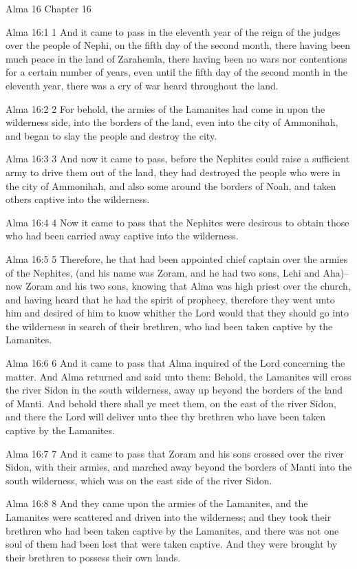 Alma 16
Chapter 16

Alma 16:1
 1 And it came to pass in the eleventh year of the reign of the
judges over the people of Nephi, on the fifth day of the second
month, there having been much peace in the land of Zarahemla,
there having been no wars nor contentions for a certain number of
years, even until the fifth day of the second month in the
eleventh year, there was a cry of war heard throughout the land.

Alma 16:2
 2 For behold, the armies of the Lamanites had come in upon the
wilderness side, into the borders of the land, even into the city
of Ammonihah, and began to slay the people and destroy the city.

Alma 16:3
 3 And now it came to pass, before the Nephites could raise a
sufficient army to drive them out of the land, they had destroyed
the people who were in the city of Ammonihah, and also some
around the borders of Noah, and taken others captive into the
wilderness.

Alma 16:4
 4 Now it came to pass that the Nephites were desirous to obtain
those who had been carried away captive into the wilderness.

Alma 16:5
 5 Therefore, he that had been appointed chief captain over the
armies of the Nephites, (and his name was Zoram, and he had two
sons, Lehi and Aha)--now Zoram and his two sons, knowing that
Alma was high priest over the church, and having heard that he
had the spirit of prophecy, therefore they went unto him and
desired of him to know whither the Lord would that they should go
into the wilderness in search of their brethren, who had been
taken captive by the Lamanites.

Alma 16:6
 6 And it came to pass that Alma inquired of the Lord concerning
the matter. And Alma returned and said unto them: Behold, the
Lamanites will cross the river Sidon in the south wilderness,
away up beyond the borders of the land of Manti. And behold
there shall ye meet them, on the east of the river Sidon, and
there the Lord will deliver unto thee thy brethren who have been
taken captive by the Lamanites.

Alma 16:7
 7 And it came to pass that Zoram and his sons crossed over the
river Sidon, with their armies, and marched away beyond the
borders of Manti into the south wilderness, which was on the east
side of the river Sidon.

Alma 16:8
 8 And they came upon the armies of the Lamanites, and the
Lamanites were scattered and driven into the wilderness; and they
took their brethren who had been taken captive by the Lamanites,
and there was not one soul of them had been lost that were taken
captive. And they were brought by their brethren to possess
their own lands.


